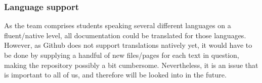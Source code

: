 \subsubsection*{Language support}

As the team comprises students speaking several different languages on a fluent/native level, all documentation could be translated for those languages. However, as Github does not support translations natively yet, it would have to be done by supplying a handful of new files/pages for each text in question, making the repository possibly a bit cumbersome. Nevertheless, it is an issue that is important to all of us, and therefore will be looked into in the future. 